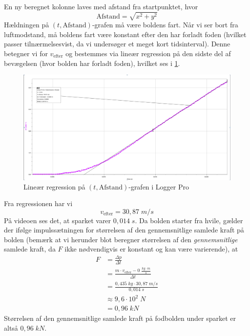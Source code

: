 \documentclass{report}
\begin{document}
En ny beregnet kolonne laves med afstand fra startpunktet, hvor 
\[
\text{Afstand} = \sqrt{x^2+y^2} 
\] 
Hældningen på $(t,\text{Afstand} )$-grafen må være boldens fart.
Når vi ser bort fra luftmodstand, må boldens fart være konstant efter den har forladt foden (hvilket passer tilnærmelsesvist, da vi undersøger et meget kort tidsinterval).
Denne betegner vi for $v_{\text{efter} }$ og bestemmes via lineær regression på den sidste del af bevægelsen (hvor bolden har forladt foden), hvilket ses i \cref{fig:v}.
\begin{figure}[H]
\begin{center}
  \includegraphics[width=\textwidth]{v.png}
\end{center}
  \caption{Lineær regression på $(t, \text{Afstand}  )$-grafen i Logger Pro}
\label{fig:v}
\end{figure}
Fra regressionen har vi 
\[
v _{\text{efter} }=30,87 \;\unit{m/s} 
\] 
På videoen ses det, at sparket varer $0,014 \;\unit{s} $.
Da bolden starter fra hvile, gælder der ifølge impulssætningen for størrelsen af den gennemsnitlige samlede kraft på bolden (bemærk at vi herunder blot beregner størrelsen af den \textit{gennemsnitlige} samlede kraft, da $F$ ikke nødvendigvis er konstant og kan være varierende), at 
\begin{equation*}
\begin{split}
  F&=\frac{\Delta p}{\Delta t}\\
  &=\frac{m \cdot v_{\text{efter} } - 0 \;\unit{\frac{kg \cdot m}{s}} }{\Delta t }\\
  &=\frac{0,435 \;\unit{kg} \cdot 30,87 \;\unit{m/s} }{0,014 \;\unit{s} }\\
  &\approx 9,6 \cdot 10^2 \;\unit{N} \\
  &=0,96 \;\unit{kN} 
\end{split}
\end{equation*}
Størrelsen af den gennemsnitlige samlede kraft på fodbolden under sparket er altså $0,96 \;\unit{kN} $.
\end{document}
